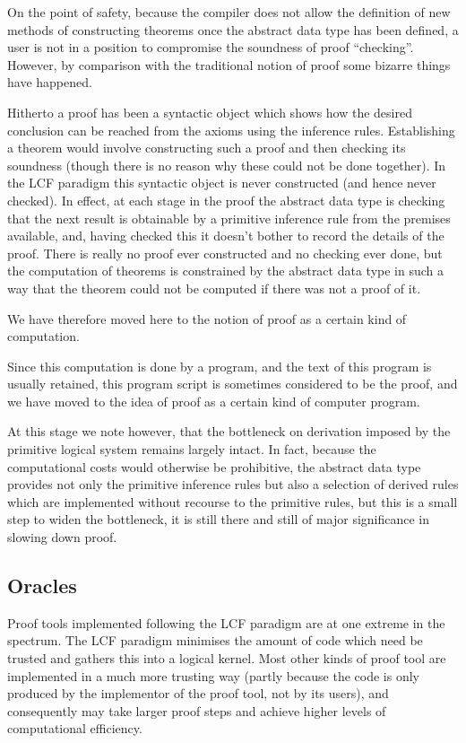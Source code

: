 On the point of safety, because the compiler does not allow the definition of new methods of constructing theorems once the abstract data type has been defined, a user is not in a position to compromise the soundness of proof ``checking''.
However, by comparison with the traditional notion of proof some bizarre things have happened.

Hitherto a proof has been a syntactic object which shows how the desired conclusion can be reached from the axioms using the inference rules.
Establishing a theorem would involve constructing such a proof and then checking its soundness (though there is no reason why these could not be done together).
In the LCF paradigm this syntactic object is never constructed (and hence never checked).
In effect, at each stage in the proof the abstract data type is checking that the next result is obtainable by a primitive inference rule from the premises available, and, having checked this it doesn't bother to record the details of the proof.
There is really no proof ever constructed and no checking ever done, but the computation of theorems is constrained by the abstract data type in such a way that the theorem could not be computed if there was not a proof of it.

We have therefore moved here to the notion of proof as a certain kind of computation.

Since this computation is done by a program, and the text of this program is usually retained, this program script is sometimes considered to be the proof, and we have moved to the idea of proof as a certain kind of computer program.

At this stage we note however, that the bottleneck on derivation imposed by the primitive logical system remains largely intact.
In fact, because the computational costs would otherwise be prohibitive, the abstract data type provides not only the primitive inference rules but also a selection of derived rules which are implemented without recourse to the primitive rules, but this is a small step to widen the bottleneck, it is still there and still of major significance in slowing down proof.

\subsection{Oracles}

Proof tools implemented following the LCF paradigm are at one extreme in the spectrum.
The LCF paradigm minimises the amount of code which need be trusted and gathers this into a logical kernel.
Most other kinds of proof tool are implemented in a much more trusting way (partly because the code is only produced by the implementor of the proof tool, not by its users), and consequently may take larger proof steps and achieve higher levels of computational efficiency.

